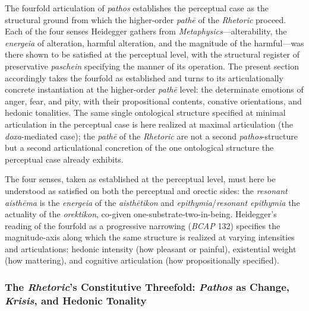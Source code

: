 The fourfold articulation of \textit{pathos} establishes the perceptual case as the structural ground from which the higher-order \textit{pathē} of the \textit{Rhetoric} proceed. Each of the four senses Heidegger gathers from \textit{Metaphysics}---alterability, the \textit{energeia} of alteration, harmful alteration, and the magnitude of the harmful---was there shown to be satisfied at the perceptual level, with the structural register of preservative \textit{paschein} specifying the manner of its operation. The present section accordingly takes the fourfold as established and turns to its articulationally concrete instantiation at the higher-order \textit{pathē} level: the determinate emotions of anger, fear, and pity, with their propositional contents, conative orientations, and hedonic tonalities. The same single ontological structure specified at minimal articulation in the perceptual case is here realized at maximal articulation (the \textit{doxa}-mediated case); the \textit{pathē} of the \textit{Rhetoric} are not a second \textit{pathos}-structure but a second articulational concretion of the one ontological structure the perceptual case already exhibits.

The four senses, taken as established at the perceptual level, must here be understood as satisfied on both the perceptual and orectic sides: the \textit{resonant aisthēma} is the \textit{energeia} of the \textit{aisthētikon} and \textit{epithymia}/\textit{resonant epithymia} the actuality of the \textit{orektikon}, co-given one-substrate-two-in-being. Heidegger's reading of the fourfold as a progressive narrowing (\textit{BCAP} 132) specifies the magnitude-axis along which the same structure is realized at varying intensities and articulations: hedonic intensity (how pleasant or painful), existential weight (how mattering), and cognitive articulation (how propositionally specified).

\subsubsection{The \textit{Rhetoric}'s Constitutive Threefold: \textit{Pathos} as Change, \textit{Krisis}, and Hedonic Tonality}

